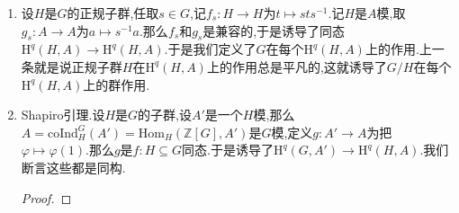 \begin{enumerate}
\begin{proof}
		首先$n=0$时是平凡的.下面设$n>0$,如果$n-1$的情况成立,把$G$模$A$嵌入到余诱导$G$模$I$中,记$B=I/A$,那么有如下交换图表,于是从$\sigma_{n-1}$是恒等映射得到$\sigma_n$也是恒等映射.
		$$\xymatrix{\mathrm{H}^{n-1}(G,B)\ar[r]^{\delta}\ar[d]_{\sigma_{n-1}}&\mathrm{H}^n(G,A)\ar[r]\ar[d]^{\sigma_n}&0\\\mathrm{H}^{n-1}(G,B)\ar[r]^{\delta}&\mathrm{H}^n(G,A)\ar[r]&0}$$
	\end{proof}
	\item 设$H$是$G$的正规子群,任取$s\in G$,记$f_s:H\to H$为$t\mapsto sts^{-1}$.记$H$是$A$模,取$g_s:A\to A$为$a\mapsto s^{-1}a$.那么$f_s$和$g_s$是兼容的,于是诱导了同态$\mathrm{H}^q(H,A)\to\mathrm{H}^q(H,A)$.于是我们定义了$G$在每个$\mathrm{H}^q(H,A)$上的作用.上一条就是说正规子群$H$在$\mathrm{H}^q(H,A)$上的作用总是平凡的,这就诱导了$G/H$在每个$\mathrm{H}^q(H,A)$上的群作用.
	\item Shapiro引理.设$H$是$G$的子群,设$A'$是一个$H$模,那么$A=\mathrm{coInd}_H^G(A')=\mathrm{Hom}_H(\mathbb{Z}[G],A')$是$G$模,定义$g:A'\to A$为把$\varphi\mapsto\varphi(1)$.那么$g$是$f:H\subseteq G$同态.于是诱导了$\mathrm{H}^q(G,A')\to\mathrm{H}^q(H,A)$.我们断言这些都是同构.
	\begin{proof}
		

\end{proof}
\end{enumerate}
